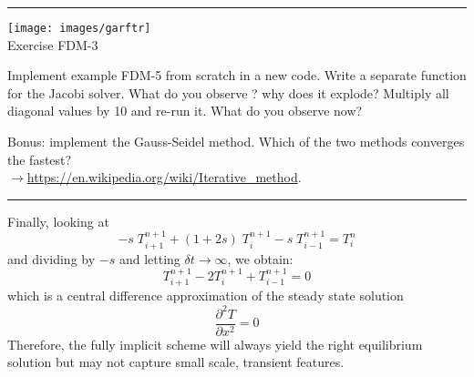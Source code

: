 \begin{center}
\begin{minipage}[t]{0.77\textwidth}
\par\noindent\rule{\textwidth}{0.4pt}

\begin{center}
\texttt{[image: images/garftr]} \\
{\color{orange}Exercise FDM-3}
\end{center}

Implement example FDM-5 from scratch in a new code.
Write a separate function for the Jacobi solver.
What do you observe ? why does it explode? 
Multiply all diagonal values by 10 and re-run it. 
What do you observe now? 

Bonus: implement the Gauss-Seidel method.
Which of the two methods converges the fastest?\\
$\rightarrow$\url{https://en.wikipedia.org/wiki/Iterative_method}. 
\par\noindent\rule{\textwidth}{0.4pt}
\end{minipage}
\end{center}


\noindent
Finally, looking at
\begin{equation}
-s\;  T_{i+1}^{n+1} + (1+2s)\;  T_{i}^{n+1} - s\;  T_{i-1}^{n+1} = T_i^{n}
\end{equation}
and dividing by $-s$ and letting $\delta t \rightarrow \infty$, we obtain:
\begin{equation}
T_{i+1}^{n+1} -2 T_{i}^{n+1} + T_{i-1}^{n+1} = 0
\end{equation}
which is a central difference approximation of the steady state solution
\begin{equation}
\frac{\partial^2 T }{\partial x^2}=0
\end{equation}
Therefore, the fully implicit scheme will always yield the right equilibrium solution 
but may not capture small scale, transient features.


